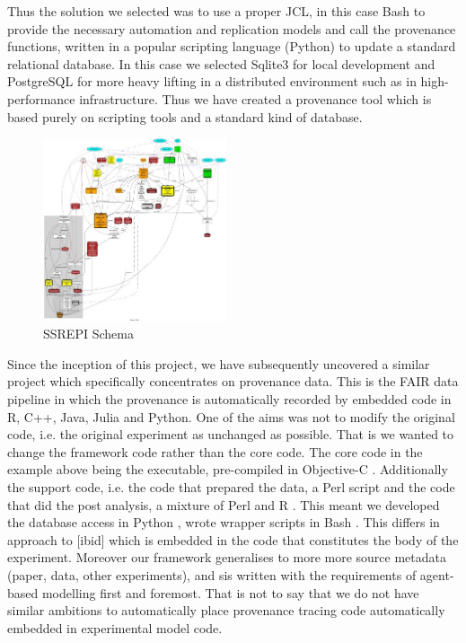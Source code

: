 \documentclass[runningheads]{llncs}
\begin{document}
Thus the solution we selected was to use a proper JCL, in this case Bash to
provide the necessary automation and replication models and call the provenance
functions, written in a popular scripting language (Python) to update a
standard relational database. In this case we selected Sqlite3 for local
development and PostgreSQL for more heavy lifting in a distributed environment
such as in high-performance infrastructure. Thus we have created a provenance
tool which is based purely on scripting tools and a standard kind of database.

\begin{figure} 
    \includegraphics[width=0.48\textwidth]{img/schema.jpeg}
\caption{SSREPI Schema} \label{fig:schema} \end{figure}

Since the inception of this project, we have subsequently uncovered a similar
project which specifically concentrates on provenance data. This is the FAIR
data pipeline \cite{mitchell2022fair} in which the provenance is automatically
recorded by embedded code in R, C++, Java, Julia and Python.  One of the aims
was not to modify the original code, i.e. the original experiment as unchanged
as possible. That is we wanted to change the framework code rather than the
core code. The core code in the example above being the executable, pre-compiled
in Objective-C \cite{objectivec}. Additionally the support code, i.e. the code
that prepared the data, a Perl \cite{perl563} script and the code that did the
post analysis, a mixture of Perl and R \cite{R422}.  This meant we developed
the database access in Python \cite{python368}, wrote wrapper scripts in Bash
\cite{bash4420}. This differs in approach to [ibid] which is embedded in the
code that constitutes the body of the experiment. Moreover our framework
generalises to more more source metadata (paper, data, other experiments), and
sis written with the requirements of agent-based modelling first and foremost.
That is not to say that we do not have similar ambitions to automatically place
provenance tracing code automatically embedded in experimental model code.
\end{document}
